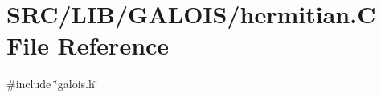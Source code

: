 \hypertarget{hermitian_8_c}{}\section{S\+R\+C/\+L\+I\+B/\+G\+A\+L\+O\+I\+S/hermitian.C File Reference}
\label{hermitian_8_c}
{\ttfamily \#include \char`\"{}galois.\+h\char`\"{}}\newline
